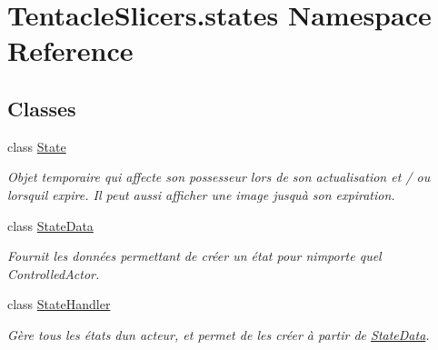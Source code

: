 \hypertarget{namespace_tentacle_slicers_1_1states}{}\section{Tentacle\+Slicers.\+states Namespace Reference}
\label{namespace_tentacle_slicers_1_1states}
\subsection*{Classes}
\begin{DoxyCompactItemize}
\item 
class \hyperlink{class_tentacle_slicers_1_1states_1_1_state}{State}
\begin{DoxyCompactList}\small\item\em Objet temporaire qui affecte son possesseur lors de son actualisation et / ou lorsqu\textquotesingle{}il expire. Il peut aussi afficher une image jusqu\textquotesingle{}à son expiration. \end{DoxyCompactList}\item 
class \hyperlink{class_tentacle_slicers_1_1states_1_1_state_data}{State\+Data}
\begin{DoxyCompactList}\small\item\em Fournit les données permettant de créer un état pour n\textquotesingle{}importe quel Controlled\+Actor. \end{DoxyCompactList}\item 
class \hyperlink{class_tentacle_slicers_1_1states_1_1_state_handler}{State\+Handler}
\begin{DoxyCompactList}\small\item\em Gère tous les états d\textquotesingle{}un acteur, et permet de les créer à partir de \hyperlink{class_tentacle_slicers_1_1states_1_1_state_data}{State\+Data}. \end{DoxyCompactList}\end{DoxyCompactItemize}
